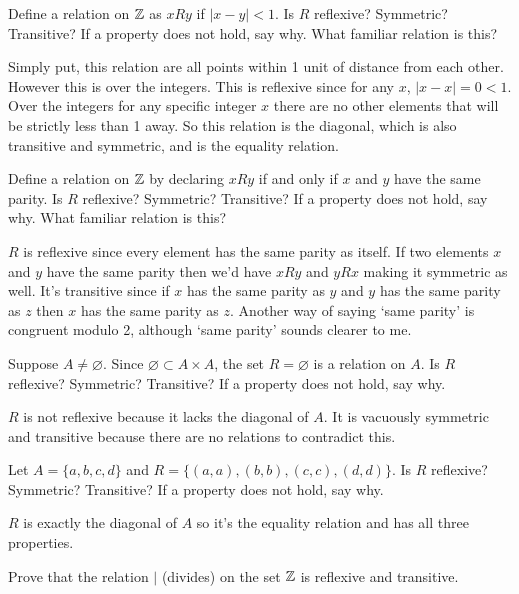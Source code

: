 \documentclass{article}
\begin{document}
\begin{problem}
Define a relation on $\mathbb{Z}$ as $xRy$ if $|x-y|<1$. Is $R$ reflexive? Symmetric? Transitive? If a property does not hold, say why. What familiar relation is this?
\end{problem}

Simply put, this relation are all points within 1 unit of distance from each other. However this is over the integers. This is reflexive since for any $x$, $|x - x| = 0 < 1$. Over the integers for any specific integer $x$ there are no other elements that will be strictly less than 1 away. So this relation is the diagonal, which is also transitive and symmetric, and is the equality relation.

\begin{problem}
Define a relation on $\mathbb{Z}$ by declaring $xRy$ if and only if $x$ and $y$ have the same parity. Is $R$ reflexive? Symmetric? Transitive? If a property does not hold, say why. What familiar relation is this?
\end{problem}

$R$ is reflexive since every element has the same parity as itself. If two elements $x$ and $y$ have the same parity then we'd have $xRy$ and $yRx$ making it symmetric as well. It's transitive since if $x$ has the same parity as $y$ and $y$ has the same parity as $z$ then $x$ has the same parity as $z$. Another way of saying `same parity' is congruent modulo 2, although `same parity' sounds clearer to me.

\begin{problem}
Suppose $A \neq \varnothing$. Since $\varnothing \subset A \times A$, the set $R = \varnothing$ is a relation on $A$. Is $R$ reflexive? Symmetric? Transitive? If a property does not hold, say why.
\end{problem}

$R$ is not reflexive because it lacks the diagonal of $A$. It is vacuously symmetric and transitive because there are no relations to contradict this.

\begin{problem}
Let $A = \{a, b, c, d\}$ and $R = \{(a, a), (b, b), (c, c), (d, d)\}$. Is $R$ reflexive? Symmetric? Transitive? If a property does not hold, say why.
\end{problem}

$R$ is exactly the diagonal of $A$ so it's the equality relation and has all three properties.

\begin{problem}
Prove that the relation $\mid$ (divides) on the set $\mathbb{Z}$ is reflexive and transitive.
\end{problem}
\end{document}
